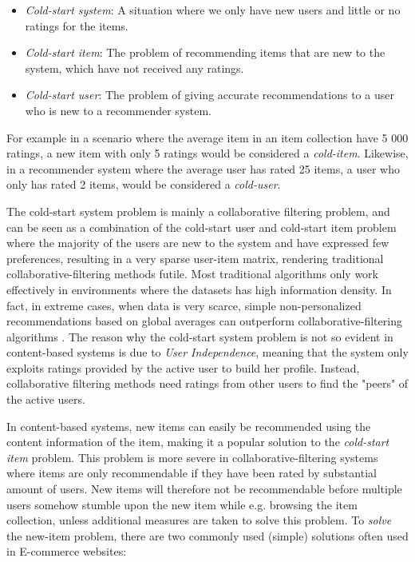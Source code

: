 \begin{itemize}
  \item \emph{Cold-start system}: A situation where we only have new users and
  little or no ratings for the items.

  \item \emph{Cold-start item}: The problem of recommending items that are new
  to the system, which have not received any ratings.

  \item \emph{Cold-start user}: The problem of giving accurate recommendations
  to a user who is new to a recommender system.
\end{itemize}

For example in a scenario where the average item in an item collection have 5 000 ratings, a new item with only 5 ratings would be considered a \emph{cold-item}. Likewise, in a recommender system where the average user has rated 25 items, a user who only has rated 2 items, would be considered a \emph{cold-user}.\linebreak[4]

The cold-start system problem is mainly a collaborative filtering problem, and
can be seen as a combination of the cold-start user and cold-start item problem
where the majority of the users are new to the system and have expressed few
preferences, resulting in a very sparse user-item matrix, rendering traditional collaborative-filtering methods futile. Most traditional algorithms only work effectively in environments where the datasets has high information density. In fact, in extreme cases, when data
is very scarce, simple non-personalized recommendations based on global
averages can outperform collaborative-filtering algorithms \cite{Park2006}. The reason why the cold-start system problem is not so evident in content-based systems is due to \emph{User Independence}, meaning that the system only exploits ratings provided by the active user to build her profile. Instead, collaborative filtering methods need ratings from other users to find the "peers" of the active users.

In content-based systems, new items can easily be
recommended using the content information of the item, making it a popular
solution to the \emph{cold-start item} problem. This problem is more
severe in collaborative-filtering systems where items are only recommendable if
they have been rated by substantial amount of users. New items will therefore not be
recommendable before multiple users somehow stumble upon the new item while
e.g. browsing the item collection, unless additional measures are taken to
solve this problem. To \emph{solve} the new-item problem, there are two commonly used (simple) solutions often used in E-commerce websites:

